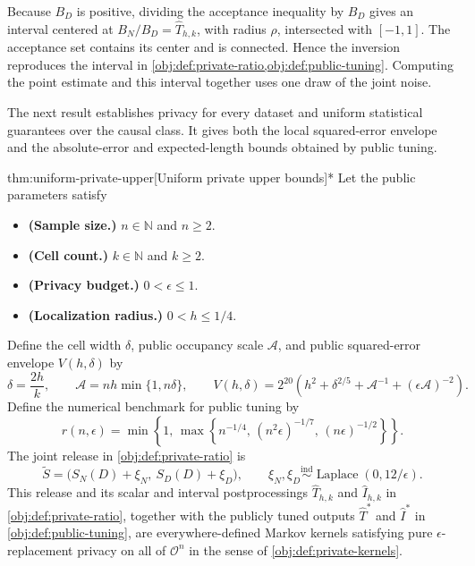 Because \(B_D\) is positive, dividing the acceptance inequality by \(B_D\) gives an interval centered at \(B_N/B_D=\widehat T_{h,k}\), with radius \(\rho\), intersected with \([-1,1]\). The acceptance set contains its center and is connected. Hence the inversion reproduces the interval in \cref{obj:def:private-ratio,obj:def:public-tuning}. Computing the point estimate and this interval together uses one draw of the joint noise.

The next result establishes privacy for every dataset and uniform statistical guarantees over the causal class. It gives both the local squared-error envelope and the absolute-error and expected-length bounds obtained by public tuning.
\begin{theoremv}{thm:uniform-private-upper}[Uniform private upper bounds]*
Let the public parameters satisfy
\begin{itemize}
\item \textbf{(Sample size.)} \(n\in\mathbb N\) and \(n\ge2\).
\item \textbf{(Cell count.)} \(k\in\mathbb N\) and \(k\ge2\).
\item \textbf{(Privacy budget.)} \(0<\epsilon\le1\).
\item \textbf{(Localization radius.)} \(0<h\le1/4\).
\end{itemize}
Define the cell width \(\delta\), public occupancy scale \(\mathcal A\), and public squared-error envelope \(V(h,\delta)\) by
\[
\delta=\frac{2h}{k},
\qquad
\mathcal A=nh\min\{1,n\delta\},
\qquad
V(h,\delta)=2^{20}\left(
h^2+\delta^{2/5}+\mathcal A^{-1}+(\epsilon\mathcal A)^{-2}
\right).
\]
Define the numerical benchmark for public tuning by
\[
r(n,\epsilon)=
\min\left\{1,\,
\max\left\{
n^{-1/4},\,
(n^2\epsilon)^{-1/7},\,
(n\epsilon)^{-1/2}
\right\}\right\}.
\]
The joint release in \cref{obj:def:private-ratio} is
\[
\widetilde S=
\bigl(S_N(D)+\xi_N,\ S_D(D)+\xi_D\bigr),
\qquad
\xi_N,\xi_D\overset{\mathrm{ind}}{\sim}
\operatorname{Laplace}(0,12/\epsilon).
\]
This release and its scalar and interval postprocessings
\(\widehat T_{h,k}\) and \(\widehat I_{h,k}\) in
\cref{obj:def:private-ratio}, together with the publicly tuned outputs
\(\widehat T^*\) and \(\widehat I^*\) in \cref{obj:def:public-tuning},
are everywhere-defined Markov kernels satisfying pure
\(\epsilon\)-replacement privacy on all of \(\mathcal O^n\) in the sense of
\cref{obj:def:private-kernels}.


\end{theoremv}
